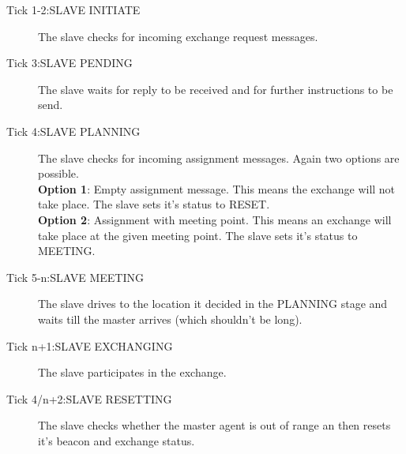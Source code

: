\documentclass[../main.tex]{subfiles}
\begin{document}
\begin{description}
	\item[Tick 1-2:SLAVE INITIATE]
	The slave checks for incoming exchange request messages.
	\item[Tick 3:SLAVE PENDING]
	The slave waits for reply to be received and for further instructions to be send.
	\item[Tick 4:SLAVE PLANNING]
	The slave checks for incoming assignment messages.
	Again two options are possible.
	\\
	\textbf{Option 1}: Empty assignment message.
	This means the exchange will not take place.
	The slave sets it's status to RESET.
	\\
	\textbf{Option 2}: Assignment with meeting point.
	This means an exchange will take place at the given meeting point.
	The slave sets it's status to MEETING.
	\item[Tick 5-n:SLAVE MEETING]
	The slave drives to the location it decided in the PLANNING stage and waits till the master arrives (which shouldn't be long).
	\item[Tick n+1:SLAVE EXCHANGING] 
	The slave participates in the exchange.
	\item[Tick 4/n+2:SLAVE RESETTING]
	The slave checks whether the master agent is out of range an then resets it's beacon and exchange status.
\end{description}
\end{document}
